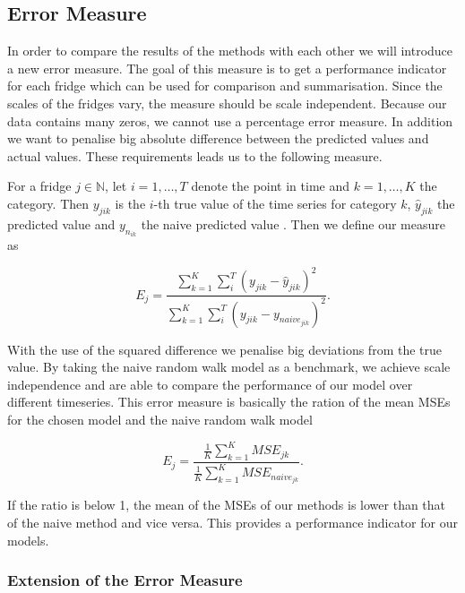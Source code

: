 \subsection{Error Measure}
\label{sec: Error Measure}

In order to compare the results of the methods with each other we will introduce a new error measure. The goal of this measure is to get a performance indicator for each fridge which can be used for comparison and summarisation. Since the scales of the fridges vary, the measure should be scale independent. Because our data contains many zeros, we cannot use a percentage error measure. In addition we want to penalise big absolute difference between the predicted values and actual values. These requirements leads us to the following measure.

For a fridge $j \in \mathbb{N}$, let $i = 1,\ldots,T$ denote the point in time and $k=1,\ldots,K$ the category. Then $y_{jik}$ is the $i$-th true value of the time series for category $k$, $\hat{y}_{jik}$ the predicted value and $y_{n_{ik}}$ the naive predicted value . Then we define our measure as

\begin{equation}
E_j=\frac{\sum_{k=1}^{K}\sum_{i}^T(y_{jik}-\hat{y}_{jik})^2}{\sum_{k=1}^{K}\sum_{i}^T(y_{jik}-y_{naive_{jik}})^2}.
\label{eq: Error Measure}
\end{equation}

With the use of the squared difference we penalise big deviations from the true value. By taking the naive random walk model as a benchmark, we achieve scale independence and are able to compare the performance of our model over different timeseries. This error measure is basically the ration of the mean MSEs for the chosen model and the naive random walk model

\begin{equation}
E_j=\frac{\frac{1}{K}\sum_{k=1}^K MSE_{jk}}{\frac{1}{K}\sum_{k=1}^K MSE_{naive_{jk}}}.
\label{eq: Error Measure MSE}
\end{equation}

If the ratio is below 1, the mean of the MSEs of our methods is lower than that of the naive method and vice versa. This provides a performance indicator for our models. 

\subsubsection{Extension of the Error Measure}
\label{sec:Error Measure Extension}

